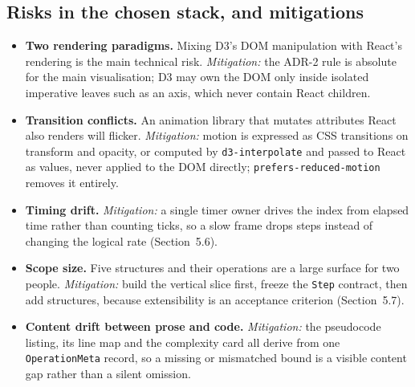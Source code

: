 \documentclass[11pt,a4paper]{article}
\newcommand{\ct}[1]{\texttt{#1}}
\begin{document}
\subsection{Risks in the chosen stack, and mitigations}

\begin{itemize}[leftmargin=1.4em,topsep=2pt,itemsep=2pt]
  \item \textbf{Two rendering paradigms.} Mixing D3's DOM manipulation with React's rendering is
        the main technical risk. \emph{Mitigation:} the ADR-2 rule is absolute for the main
        visualisation; D3 may own the DOM only inside isolated imperative leaves such as an axis,
        which never contain React children.
  \item \textbf{Transition conflicts.} An animation library that mutates attributes React also
        renders will flicker. \emph{Mitigation:} motion is expressed as CSS transitions on
        transform and opacity, or computed by \ct{d3-interpolate} and passed to React as values,
        never applied to the DOM directly; \ct{prefers-reduced-motion} removes it entirely.
  \item \textbf{Timing drift.} \emph{Mitigation:} a single timer owner drives the index from
        elapsed time rather than counting ticks, so a slow frame drops steps instead of changing
        the logical rate (Section~5.6).
  \item \textbf{Scope size.} Five structures and their operations are a large surface for two
        people. \emph{Mitigation:} build the vertical slice first, freeze the \ct{Step} contract,
        then add structures, because extensibility is an acceptance criterion (Section~5.7).
  \item \textbf{Content drift between prose and code.} \emph{Mitigation:} the pseudocode listing,
        its line map and the complexity card all derive from one \ct{OperationMeta} record, so a
        missing or mismatched bound is a visible content gap rather than a silent omission.
\end{itemize}
\end{document}
